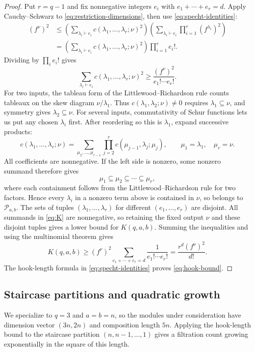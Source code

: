 \documentclass[a4paper,reqno,10pt]{amsart}
\theoremstyle{definition}
\numberwithin{equation}{section}
\newcommand{\parts}{\mathcal P}
\begin{document}
\begin{proof}
Put $r=q-1$ and fix nonnegative integers $e_i$ with
$e_1+\cdots+e_r=d$. Apply Cauchy--Schwarz to
\eqref{eq:restriction-dimensions}, then use
\eqref{eq:specht-identities}:
\begin{align*}
 (f^\nu)^2
 &\leq
 \left(\sum_{\lambda_i\vdash e_i}
     c(\lambda_1,\ldots,\lambda_r;\nu)^2\right)
 \left(\sum_{\lambda_i\vdash e_i}
     \prod_{i=1}^r(f^{\lambda_i})^2\right)\\
 &=\left(\sum_{\lambda_i\vdash e_i}
     c(\lambda_1,\ldots,\lambda_r;\nu)^2\right)
     \prod_{i=1}^r e_i!.
\end{align*}
Dividing by $\prod_i e_i!$ gives
\[
 \sum_{\lambda_i\vdash e_i}c(\lambda_1,\ldots,\lambda_r;\nu)^2
 \geq \frac{(f^\nu)^2}{e_1!\cdots e_r!}.
\]
For two inputs, the tableau form of the Littlewood--Richardson rule
\cite[Section~5.2, Proposition~3]{Fulton} counts tableaux on the skew diagram
$\nu/\lambda_1$. Thus
$c(\lambda_1,\lambda_2;\nu)\ne0$ requires
$\lambda_1\subseteq\nu$, and symmetry gives
$\lambda_2\subseteq\nu$. For several inputs, commutativity of Schur
functions lets us put any chosen $\lambda_i$ first. After reordering
so this is $\lambda_1$, expand successive products:
\[
 c(\lambda_1,\ldots,\lambda_r;\nu)
 =\sum_{\mu_2,\ldots,\mu_{r-1}}
   \prod_{j=2}^r c(\mu_{j-1},\lambda_j;\mu_j),
 \qquad \mu_1=\lambda_1,\quad\mu_r=\nu.
\]
All coefficients are nonnegative. If the left side is nonzero, some
nonzero summand therefore gives
\[
 \mu_1\subseteq\mu_2\subseteq\cdots\subseteq\mu_r,
\]
where each containment follows from the Littlewood--Richardson rule for
two factors. Hence every
$\lambda_i$ in a nonzero term above is contained in $\nu$, so belongs
to $\parts_{a,b}$.
The sets of tuples $(\lambda_1,\ldots,\lambda_r)$ for different
$(e_1,\ldots,e_r)$ are
disjoint. All summands in \eqref{eq:K} are nonnegative, so retaining the
fixed output $\nu$ and these disjoint tuples gives a lower bound for
$K(q,a,b)$. Summing the inequalities and using the multinomial theorem gives
\[
 K(q,a,b)\geq(f^\nu)^2
    \sum_{e_1+\cdots+e_r=d}\frac1{e_1!\cdots e_r!}
  =\frac{r^d(f^\nu)^2}{d!}.
\]
The hook-length formula in \eqref{eq:specht-identities} proves
\eqref{eq:hook-bound}.
\end{proof}

\subsection{Staircase partitions and quadratic growth}

We specialize to $q=3$ and $a=b=n$, so the modules under consideration
have dimension vector $(3n,2n)$ and composition length $5n$.
Applying the hook-length bound to the staircase partition
$(n,n-1,\ldots,1)$ gives a filtration count growing exponentially in
the square of this length.
\end{document}
